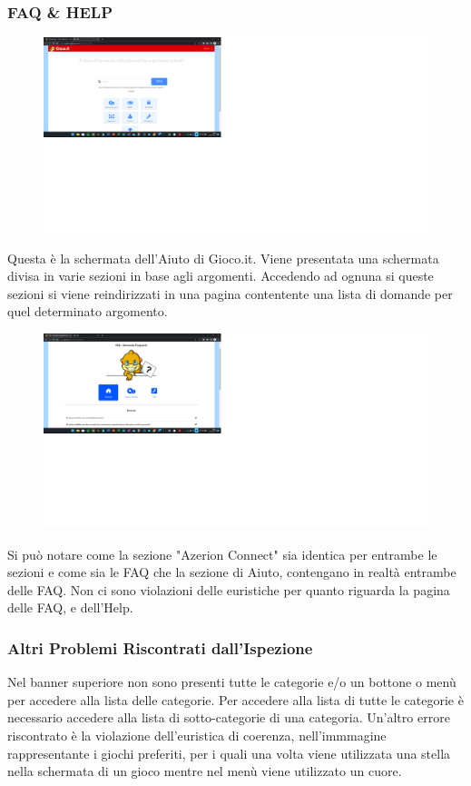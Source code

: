 \documentclass[../Report.tex]{subfiles}
\begin{document}
    \subsubsection{FAQ & HELP}
    \begin{figure}[H]
        \includegraphics[width=\linewidth]{Assestment20.png}
        \centering
    \end{figure}
    Questa è la schermata dell'Aiuto di Gioco.it. Viene presentata una schermata divisa in varie sezioni in base agli argomenti. Accedendo ad ognuna si queste sezioni si viene reindirizzati in una pagina contentente una lista di domande per quel determinato argomento. 
    \begin{figure}[H]
        \includegraphics[width=\linewidth]{Assestment21.png}
        \centering
    \end{figure}
    Si può notare come la sezione "Azerion Connect" sia identica per entrambe le sezioni e come sia le FAQ che la sezione di Aiuto, contengano in realtà entrambe delle FAQ. Non ci sono violazioni delle euristiche per quanto riguarda la pagina delle FAQ, e dell'Help.


    \subsubsection{Altri Problemi Riscontrati dall’Ispezione}
    Nel banner superiore non sono presenti tutte le categorie e/o un bottone o menù per accedere alla lista delle categorie. Per accedere alla lista di tutte le categorie è necessario accedere alla lista di sotto-categorie di una categoria. 
    Un’altro errore riscontrato è la violazione dell’euristica di coerenza, nell’immmagine rappresentante i giochi preferiti, per i quali una volta viene utilizzata una stella nella schermata di un gioco mentre nel menù viene utilizzato un cuore.
\end{document}
